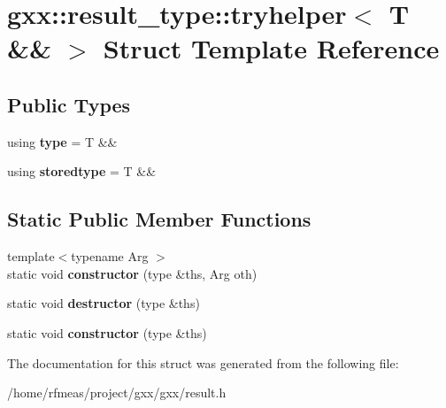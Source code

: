 \hypertarget{structgxx_1_1result__type_1_1tryhelper_3_01T_01_6_6_01_4}{}\section{gxx\+:\+:result\+\_\+type\+:\+:tryhelper$<$ T \&\& $>$ Struct Template Reference}
\label{structgxx_1_1result__type_1_1tryhelper_3_01T_01_6_6_01_4}
\subsection*{Public Types}
\begin{DoxyCompactItemize}
\item 
using {\bfseries type} = T \&\&\hypertarget{structgxx_1_1result__type_1_1tryhelper_3_01T_01_6_6_01_4_a3f63cf205ce5803f383331625631b739}{}\label{structgxx_1_1result__type_1_1tryhelper_3_01T_01_6_6_01_4_a3f63cf205ce5803f383331625631b739}

\item 
using {\bfseries storedtype} = T \&\&\hypertarget{structgxx_1_1result__type_1_1tryhelper_3_01T_01_6_6_01_4_add9d6f06a2b0c33cb6f1f39771bc5ee0}{}\label{structgxx_1_1result__type_1_1tryhelper_3_01T_01_6_6_01_4_add9d6f06a2b0c33cb6f1f39771bc5ee0}

\end{DoxyCompactItemize}
\subsection*{Static Public Member Functions}
\begin{DoxyCompactItemize}
\item 
{\footnotesize template$<$typename Arg $>$ }\\static void {\bfseries constructor} (type \&ths, Arg oth)\hypertarget{structgxx_1_1result__type_1_1tryhelper_3_01T_01_6_6_01_4_a62f864dbf2be9a00172a2b0fedb4d530}{}\label{structgxx_1_1result__type_1_1tryhelper_3_01T_01_6_6_01_4_a62f864dbf2be9a00172a2b0fedb4d530}

\item 
static void {\bfseries destructor} (type \&ths)\hypertarget{structgxx_1_1result__type_1_1tryhelper_3_01T_01_6_6_01_4_a151e8f9d58c375652d1d6f2f41c0c8ba}{}\label{structgxx_1_1result__type_1_1tryhelper_3_01T_01_6_6_01_4_a151e8f9d58c375652d1d6f2f41c0c8ba}

\item 
static void {\bfseries constructor} (type \&ths)\hypertarget{structgxx_1_1result__type_1_1tryhelper_3_01T_01_6_6_01_4_a5a44d01389684fa7355dbfd7f82a886c}{}\label{structgxx_1_1result__type_1_1tryhelper_3_01T_01_6_6_01_4_a5a44d01389684fa7355dbfd7f82a886c}

\end{DoxyCompactItemize}


The documentation for this struct was generated from the following file\+:\begin{DoxyCompactItemize}
\item 
/home/rfmeas/project/gxx/gxx/result.\+h\end{DoxyCompactItemize}
